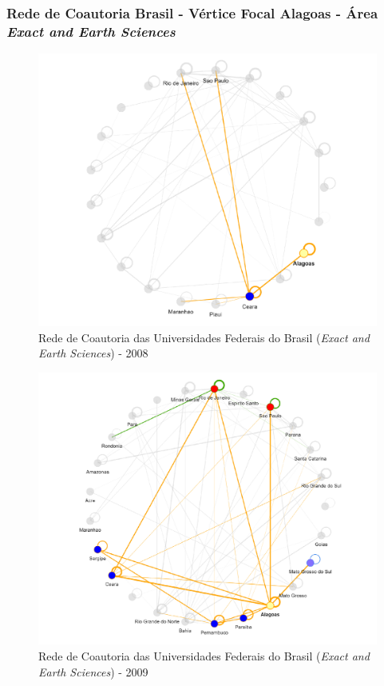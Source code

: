 \subsubsection{Rede de Coautoria Brasil - Vértice Focal Alagoas - Área \textit{Exact and Earth Sciences}}

\begin{figure}[H]
	\centering
	\includegraphics[width=\linewidth]{Imagens/rede-exact-AL-2008.pdf}
	\caption{Rede de Coautoria das Universidades Federais do Brasil (\textit{Exact and Earth Sciences}) - 2008}
	\label{Rede de Coautoria - UF EXACT AL 2008}
\end{figure}

\begin{figure}[H]
	\centering
	\includegraphics[width=\linewidth]{Imagens/rede-exact-AL-2009.pdf}
	\caption{Rede de Coautoria das Universidades Federais do Brasil (\textit{Exact and Earth Sciences}) - 2009}
	\label{Rede de Coautoria - UF EXACT AL 2009}
\end{figure}

